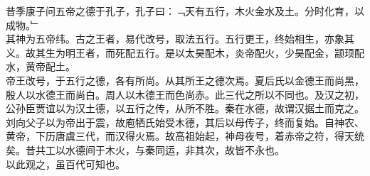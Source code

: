 昔季康子问五帝之德于孔子，孔子曰：﹁天有五行，木火金水及土。分时化育，以成物。﹂\\
其神为五帝纬。古之王者，易代改号，取法五行。五行更王，终始相生，亦象其义。故其生为明王者，而死配五行。是以太昊配木，炎帝配火，少昊配金，颛顼配水，黄帝配土。\\
帝王改号，于五行之德，各有所尚。从其所王之德次焉。夏后氏以金德王而尚黑，殷人以水德王而尚白。周人以木德王而色尚赤。此三代之所以不同也。及汉之初，公孙臣贾谊以为汉土德，以五行之传，从所不胜。秦在水德，故谓汉据土而克之。刘向父子以为帝出于震，故庖牺氏始受木德，其后以母传子，终而复始。自神农、黄帝，下历唐虞三代，而汉得火焉。故高祖始起，神母夜号，着赤帝之符，得天统矣。昔共工以水德间于木火，与秦同运，非其次，故皆不永也。
\\
以此观之，虽百代可知也。
%
%
